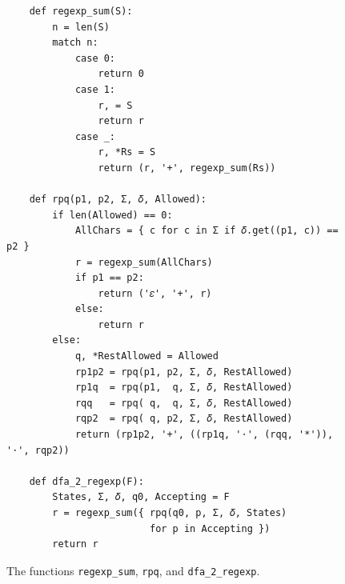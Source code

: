 \begin{figure}[!ht]
\centering
\begin{verbatim}
    def regexp_sum(S):
        n = len(S)
        match n:
            case 0:
                return 0
            case 1:
                r, = S
                return r
            case _:
                r, *Rs = S
                return (r, '+', regexp_sum(Rs))

    def rpq(p1, p2, Σ, 𝛿, Allowed):
        if len(Allowed) == 0:
            AllChars = { c for c in Σ if 𝛿.get((p1, c)) == p2 }
            r = regexp_sum(AllChars)
            if p1 == p2:
                return ('𝜀', '+', r)
            else:
                return r
        else:
            q, *RestAllowed = Allowed
            rp1p2 = rpq(p1, p2, Σ, 𝛿, RestAllowed)
            rp1q  = rpq(p1,  q, Σ, 𝛿, RestAllowed)
            rqq   = rpq( q,  q, Σ, 𝛿, RestAllowed)
            rqp2  = rpq( q, p2, Σ, 𝛿, RestAllowed)
            return (rp1p2, '+', ((rp1q, '⋅', (rqq, '*')), '⋅', rqp2))

    def dfa_2_regexp(F):
        States, Σ, 𝛿, q0, Accepting = F
        r = regexp_sum({ rpq(q0, p, Σ, 𝛿, States)
                         for p in Accepting })
        return r
\end{verbatim}
\vspace*{-0.3cm}
\caption{The functions \texttt{regexp\_sum}, \texttt{rpq}, and \texttt{dfa\_2\_regexp}.}
\label{fig:05-DFA-2-RegExp.ipynb:rpq}
\end{figure}

